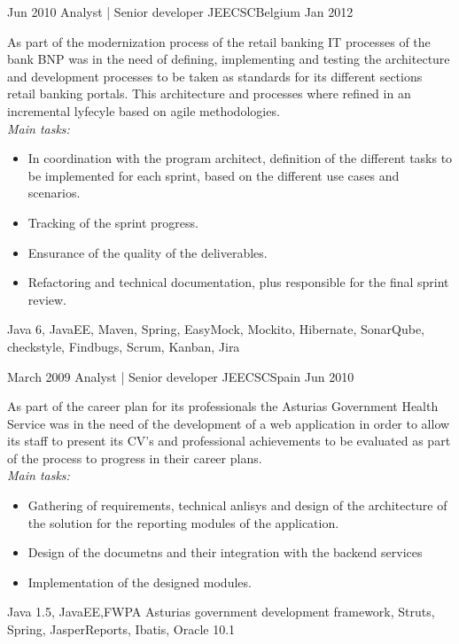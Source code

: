 \begin{experiences}
  \emptySeparator
  
  
  \experience
    {Jun 2010} {Analyst | Senior developer JEE}{CSC}{Belgium}
    {Jan 2012}    {

As part of the modernization process of the retail banking IT processes of the bank BNP was in
the need of defining, implementing and testing the architecture and development processes to be
taken as standards for its different sections retail banking portals. This architecture and
processes where refined in an incremental lyfecyle based on agile methodologies.  
\\
\emph{Main tasks:}    	
                      \begin{itemize}
                        \item In coordination with the program architect, definition of the different tasks to be implemented for each sprint, based on the different use cases and scenarios.
                        \item Tracking of the sprint progress.                       
                        \item Ensurance of the quality of the deliverables.
                        \item Refactoring and technical documentation,
plus responsible for the final sprint review.
                      \end{itemize}
                    }
                    {Java 6, JavaEE, Maven, Spring, EasyMock, Mockito, Hibernate, SonarQube, checkstyle, Findbugs, Scrum, Kanban, Jira}
                    
  \emptySeparator
  
  \experience
    {March 2009} {Analyst | Senior developer JEE}{CSC}{Spain}
    {Jun 2010}    {

As part of the career plan for its professionals the Asturias Government Health Service was in
the need of the development of a web application in order to allow its staff to present its CV’s
and professional achievements to be evaluated as part of the process to progress in their career
plans.    
\\
\emph{Main tasks:}    	
                      \begin{itemize}
                        \item Gathering of requirements, technical anlisys and design of the architecture of the solution for the reporting modules of the application.
                        \item Design of the documetns and their integration with the backend services                       
                        \item Implementation of the designed modules.
                      \end{itemize}
                    }
                    {Java 1.5, JavaEE,FWPA Asturias government development framework,
Struts, Spring, JasperReports, Ibatis, Oracle 10.1}
                    

\end{experiences}
